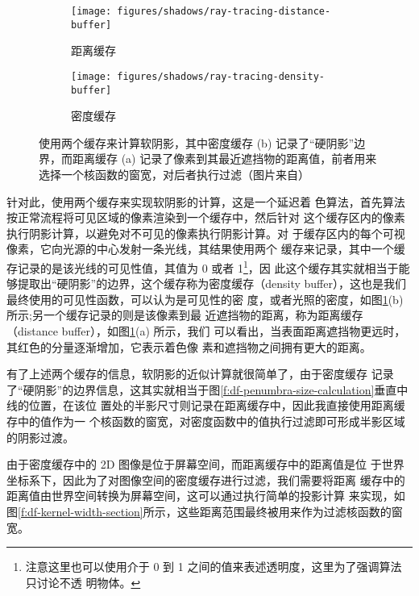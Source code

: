 \begin{figure}
\begin{fullwidth}
	\begin{subfigure}[b]{0.5\thewidth}
		\texttt{[image: figures/shadows/ray-tracing-distance-buffer]}	
		\caption{距离缓存}
	\end{subfigure}
	\begin{subfigure}[b]{0.5\thewidth}
		\texttt{[image: figures/shadows/ray-tracing-density-buffer]}	
		\caption{密度缓存}
	\end{subfigure}
\caption{使用两个缓存来计算软阴影，其中密度缓存 (b) 记录了“硬阴影”边界，而距离缓存 (a) 记录了像素到其最近遮挡物的距离值，前者用来选择一个核函数的窗宽，对后者执行过滤（图片来自\cite{a:Implementingfastraytracedsoftshadowsinagameengine}）}
\label{f:df-ray-tracing-buffers} %
\end{fullwidth}
\end{figure}

针对此，\cite{a:Implementingfastraytracedsoftshadowsinagameengine}使用两个缓存来实现软阴影的计算，这是一个延迟着 色算法，首先算法按正常流程将可见区域的像素渲染到一个缓存中，然后针对 这个缓存区内的像素执行阴影计算，以避免对不可见的像素执行阴影计算。对 于缓存区内的每个可视像素，它向光源的中心发射一条光线，其结果使用两个 缓存来记录，其中一个缓存记录的是该光线的可见性值，其值为 0 或者 1\footnote{注意这里也可以使用介于 0 到 1 之间的值来表述透明度，这里为了强调算法只讨论不透 明物体。}，因 此这个缓存其实就相当于能够提取出“硬阴影”的边界，这个缓存称为密度缓存（density buffer），这也是我们最终使用的可见性函数，可以认为是可见性的密 度，或者光照的密度，如图\ref{f:df-ray-tracing-buffers}(b) 所示;另一个缓存记录的则是该像素到最 近遮挡物的距离，称为距离缓存（distance buffer），如图\ref{f:df-ray-tracing-buffers}(a) 所示，我们 可以看出，当表面距离遮挡物更远时，其红色的分量逐渐增加，它表示着色像 素和遮挡物之间拥有更大的距离。

有了上述两个缓存的信息，软阴影的近似计算就很简单了，由于密度缓存 记录了“硬阴影”的边界信息，这其实就相当于图\ref{f:df-penumbra-size-calculation}垂直中线的位置，在该位 置处的半影尺寸则记录在距离缓存中，因此我直接使用距离缓存中的值作为一 个核函数的窗宽，对密度函数中的值执行过滤即可形成半影区域的阴影过渡。

由于密度缓存中的 2D 图像是位于屏幕空间，而距离缓存中的距离值是位 于世界坐标系下，因此为了对图像空间的密度缓存进行过滤，我们需要将距离 缓存中的距离值由世界空间转换为屏幕空间，这可以通过执行简单的投影计算 来实现，如图\ref{f:df-kernel-width-section}所示，这些距离范围最终被用来作为过滤核函数的窗宽。

